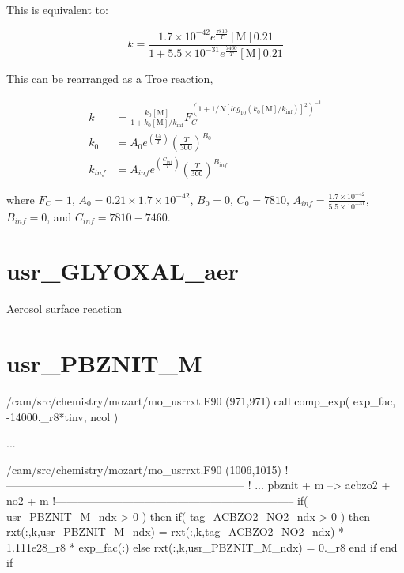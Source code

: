 \documentclass[titlepage]{article}
\begin{document}
This is equivalent to:

\begin{equation}
k = \frac{1.7 \times 10^{-42} e^{\frac{7810}{T}} [\mbox{M}] 0.21}{1 + 5.5 \times 10^{-31} e^{\frac{7460}{T}} [\mbox{M}] 0.21 }
\end{equation}

This can be rearranged as a Troe reaction,

\begin{equation}
\begin{split}
k & = \frac{k_0[\mbox{M}]}{1+k_0[\mbox{M}]/k_{\inf}}F_C^{(1+1/N[log_{10}(k_0[\mbox{M}]/k_{\inf})]^2)^{-1}} \\
k_0 & = A_0 e^{\left( \frac{C_0}{T} \right)} \left( \frac{T}{300} \right)^{B_0} \\
k_{inf} & = A_{inf} e^{\left( \frac{C_{inf}}{T} \right)} \left( \frac{T}{300} \right)^{B_{inf}}
\end{split}
\end{equation}

\noindent where $F_C = 1$, $A_0 = 0.21 \times 1.7 \times 10^{-42}$, $B_0 = 0$, $C_0 = 7810$, $A_{inf} = \frac{1.7 \times 10^{-42}}{5.5 \times 10^{-31}}$, $B_{inf} = 0$, and $C_{inf} = 7810-7460$.


\section{usr\_GLYOXAL\_aer}

Aerosol surface reaction


\section{usr\_PBZNIT\_M}

\begin{blockcode}[commandchars=\\\{\}]
\color{gray}/cam/src/chemistry/mozart/mo_usrrxt.F90 (971,971)
       call comp_exp( exp_fac, -14000._r8*tinv, ncol )

\color{gray}...

\color{gray}/cam/src/chemistry/mozart/mo_usrrxt.F90 (1006,1015)
!-----------------------------------------------------------------
!       ... pbznit + m --> acbzo2 + no2 + m
!-----------------------------------------------------------------
       if( usr_PBZNIT_M_ndx > 0 ) then
          if( tag_ACBZO2_NO2_ndx > 0 ) then
             rxt(:,k,usr_PBZNIT_M_ndx) = rxt(:,k,tag_ACBZO2_NO2_ndx) * 1.111e28_r8 * exp_fac(:)
          else
             rxt(:,k,usr_PBZNIT_M_ndx) = 0._r8
          end if
       end if
\end{blockcode}
\end{document}
